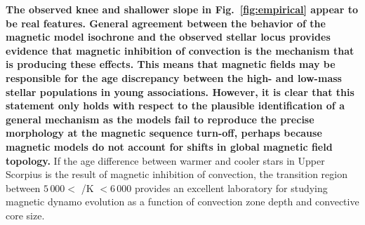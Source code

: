 \documentclass{aa}
\begin{document}
{\bf The observed knee and shallower slope in Fig.~\ref{fig:empirical} appear to be real features. General agreement between the behavior of the magnetic model isochrone and the observed stellar locus provides evidence that magnetic inhibition of convection is the mechanism that is producing these effects. This means that magnetic fields may be responsible for the age discrepancy between the high- and low-mass stellar populations in young associations. However, it is clear that this statement only holds with respect to the plausible identification of a general mechanism as the models fail to reproduce the precise morphology at the magnetic sequence turn-off, perhaps because magnetic models do not account for shifts in global magnetic field topology.}
If the age difference between warmer and cooler stars in Upper Scorpius is the result of magnetic inhibition of convection, the transition region between $5\,000 <$ \teff/K $< 6\,000$ provides an excellent laboratory for studying magnetic dynamo evolution as a function of convection zone depth and convective core size.

\end{document}

